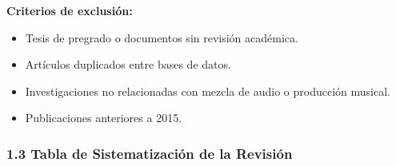 \documentclass[12pt]{article}
\begin{document}
\textbf{Criterios de exclusión:}

\begin{itemize}
    \item Tesis de pregrado o documentos sin revisión académica.
    \item Artículos duplicados entre bases de datos.
    \item Investigaciones no relacionadas con mezcla de audio o producción musical.
    \item Publicaciones anteriores a 2015.
\end{itemize}

\subsubsection*{1.3 Tabla de Sistematización de la Revisión}
\end{document}
